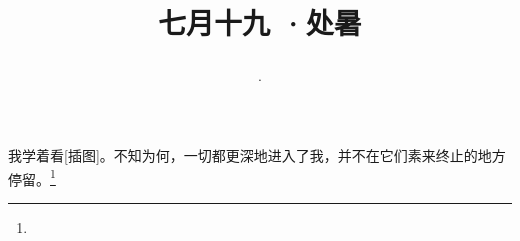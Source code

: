 \title{\date[d=22,m=8,y=2024][year:cn-y,年,month:cn,day:cn,日,·,weekday]·七月十九 ·处暑}
我学着看[插图]。不知为何，一切都更深地进入了我，并不在它们素来终止的地方停留。\footnote{ }

